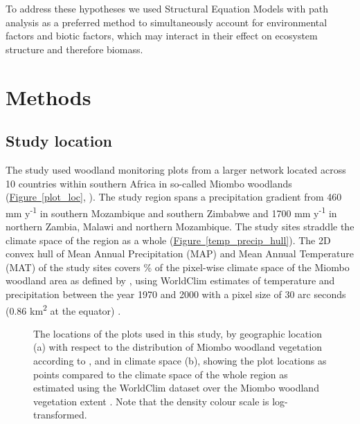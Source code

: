 \documentclass[11pt,a4paper]{article}
\begin{document}
To address these hypotheses we used Structural Equation Models with path analysis as a preferred method to simultaneously account for environmental factors and biotic factors, which may interact in their effect on ecosystem structure and therefore biomass.

\section{Methods}

\subsection{Study location}

The study used \nplots{} woodland monitoring plots from a larger network located across 10 countries within southern Africa in so-called Miombo woodlands (\hyperref[plot_loc]{Figure~\ref*{plot_loc}}, \citealt{White1983}). The study region spans a precipitation gradient from \textapprox{}460 mm y\textsuperscript{-1} in southern Mozambique and southern Zimbabwe and \textapprox{}1700 mm y\textsuperscript{-1} in northern Zambia, Malawi and northern Mozambique. The study sites straddle the climate space of the region as a whole (\hyperref[temp_precip_hull]{Figure~\ref*{temp_precip_hull}}). The 2D convex hull of Mean Annual Precipitation (MAP) and Mean Annual Temperature (MAT) of the study sites covers \hullcover{}\% of the pixel-wise climate space of the Miombo woodland area as defined by \citet{White}, using WorldClim estimates of temperature and precipitation between the year 1970 and 2000 with a pixel size of 30 arc seconds (0.86 km\textsuperscript{2} at the equator) \citep{worldclim}. 

\begin{figure}[H]
	\centering
    \qquad
{}%
\caption{The locations of the \nplots{} plots used in this study, by geographic location (a) with respect to the distribution of Miombo woodland vegetation according to \citet{White}, and in climate space (b), showing the plot locations as points compared to the climate space of the whole region as estimated using the WorldClim dataset over the Miombo woodland vegetation extent \citep{worldclim}. Note that the density colour scale is log-transformed.}
\end{figure}
\end{document}

